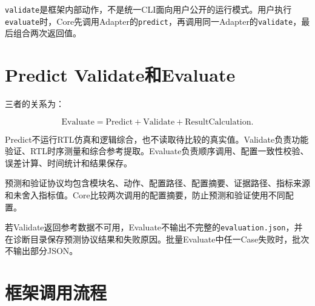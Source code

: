 \documentclass[a4paper,oneside,11pt]{ctexrep}
\begin{document}
\texttt{validate}是框架内部动作，不是统一CLI面向用户公开的运行模式。用户执行\texttt{evaluate}时，Core先调用Adapter的\texttt{predict}，再调用同一Adapter的\texttt{validate}，最后组合两次返回值。

\section{Predict Validate和Evaluate}

三者的关系为：

\begin{equation}
    \mathrm{Evaluate}
    =\mathrm{Predict}+\mathrm{Validate}+\mathrm{ResultCalculation}.
\end{equation}

Predict不运行RTL仿真和逻辑综合，也不读取待比较的真实值。Validate负责功能验证、RTL时序测量和综合参考提取。Evaluate负责顺序调用、配置一致性校验、误差计算、时间统计和结果保存。

预测和验证协议均包含模块名、动作、配置路径、配置摘要、证据路径、指标来源和未舍入指标值。Core比较两次调用的配置摘要，防止预测和验证使用不同配置。

若Validate返回参考数据不可用，Evaluate不输出不完整的\texttt{evaluation.json}，并在诊断目录保存预测协议结果和失败原因。批量Evaluate中任一Case失败时，批次不输出部分JSON。

\section{框架调用流程}
\end{document}

